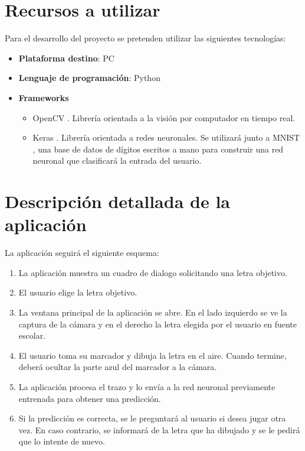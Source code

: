 \documentclass[12pt,spanish]{article}
\begin{document}
\section{Recursos a utilizar}

Para el desarrollo del proyecto se pretenden utilizar las siguientes tecnologías:
\begin{itemize}
	\item \textbf{Plataforma destino}: PC
	\item \textbf{Lenguaje de programación}: Python \cite{python}
	\item \textbf{Frameworks}
		\begin{itemize}
			\item OpenCV \cite{opencv}. Librería orientada a la visión por computador en tiempo real.
			\item Keras \cite{Keras}. Librería orientada a redes neuronales. Se utilizará junto a MNIST \cite{mnist}, una base de datos de dígitos escritos a mano para construir una red neuronal que clasificará la entrada del usuario.
		\end{itemize}
\end{itemize}

\section{Descripción detallada de la aplicación}

La aplicación seguirá el siguiente esquema:
\begin{enumerate}
  \item La aplicación muestra un cuadro de dialogo solicitando una letra objetivo.
  \item El usuario elige la letra objetivo.
  \item La ventana principal de la aplicación se abre. En el lado izquierdo se ve la captura de la cámara y en el derecho la letra elegida por el usuario en fuente escolar.
  \item El usuario toma su marcador y dibuja la letra en el aire. Cuando termine, deberá ocultar la parte azul del marcador a la cámara.
  \item La aplicación procesa el trazo y lo envía a la red neuronal previamente entrenada para obtener una predicción.
  \item Si la predicción es correcta, se le preguntará al usuario si desea jugar otra vez. En caso contrario, se informará de la letra que ha dibujado y se le pedirá que lo intente de nuevo.
\end{enumerate}
\end{document}
